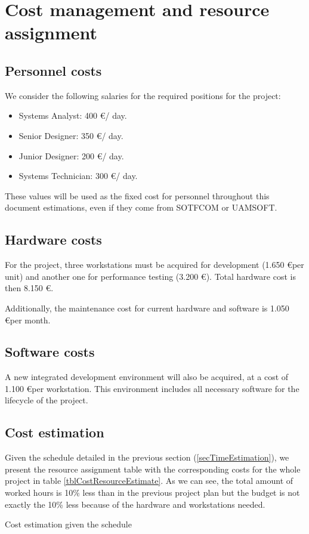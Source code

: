 \section{Cost management and resource assignment}

\subsection{Personnel costs}

We consider the following salaries for the required positions for the project:

\begin{itemize}
\item Systems Analyst: 400 \euro / day.
\item Senior Designer: 350 \euro / day.
\item Junior Designer: 200 \euro / day.
\item Systems Technician: 300 \euro / day.
\end{itemize}

These values will be used as the fixed cost for personnel throughout this document estimations, even if they come from SOTFCOM or UAMSOFT.

\subsection{Hardware costs}

For the project, three workstations must be acquired for development (1.650 \euro per unit) and another one for performance testing (3.200 \euro). Total hardware cost is then 8.150 \euro.

Additionally, the maintenance cost for current hardware and software is 1.050 \euro per month.

\subsection{Software costs}

A new integrated development environment will also be acquired, at a cost of 1.100 \euro per workstation. This environment includes all necessary software for the lifecycle of the project.

\subsection{Cost estimation}

Given the schedule detailed in the previous section (\ref{secTimeEstimation}), we present the resource assignment table with the corresponding costs for the whole project in table \ref{tblCostResourceEstimate}. As we can see, the total amount of worked hours is 10\% less than in the previous project plan but the budget is not exactly the 10\% less because of the hardware and workstations needed.

\begin{table}[hbtp]
\centering

\caption{Cost estimation given the schedule}
\label{tblCostResourceEstimate}
\end{table}
